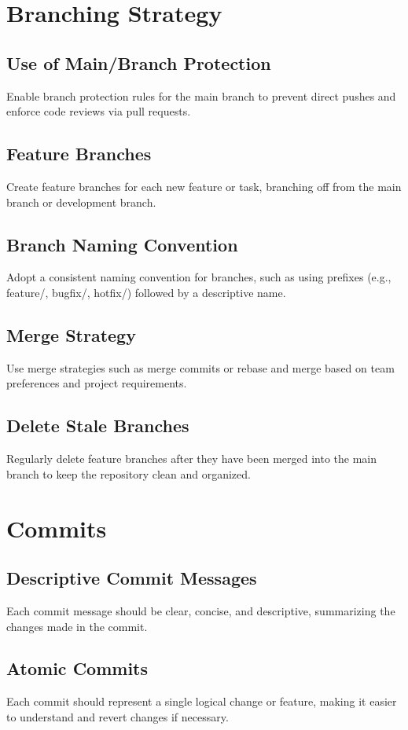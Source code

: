 \documentclass{article}
\begin{document}
\section{Branching Strategy}
\subsection{Use of Main/Branch Protection}
Enable branch protection rules for the main branch to prevent direct pushes and enforce code reviews via pull requests.
\subsection{Feature Branches}
Create feature branches for each new feature or task, branching off from the main branch or development branch.
\subsection{Branch Naming Convention}
Adopt a consistent naming convention for branches, such as using prefixes (e.g., feature/, bugfix/, hotfix/) followed by a descriptive name.
\subsection{Merge Strategy}
Use merge strategies such as merge commits or rebase and merge based on team preferences and project requirements.
\subsection{Delete Stale Branches}
Regularly delete feature branches after they have been merged into the main branch to keep the repository clean and organized.

\section{Commits}
\subsection{Descriptive Commit Messages}
Each commit message should be clear, concise, and descriptive, summarizing the changes made in the commit.
\subsection{Atomic Commits}
Each commit should represent a single logical change or feature, making it easier to understand and revert changes if necessary.
\end{document}
